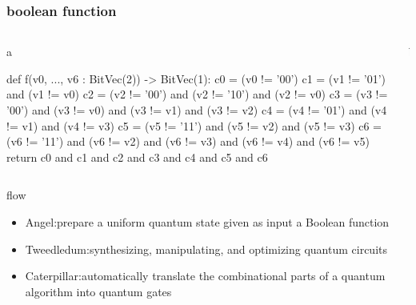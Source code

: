 \documentclass[aspectratio=1610]{beamer}
\begin{document}
\begin{frame}[fragile]
  \frametitle{boolean function}
  \begin{columns}
    \begin{column}{.5\linewidth}
      \begin{block}{a}
        \begin{python}
          def f(v0, ..., v6 : BitVec(2)) -> BitVec(1):
            c0 = (v0 != ’00’)
            c1 = (v1 != ’01’) and (v1 != v0)
            c2 = (v2 != ’00’) and (v2 != ’10’) and (v2 != v0)
            c3 = (v3 != ’00’) and (v3 != v0) and (v3 != v1) and (v3 != v2)
            c4 = (v4 != ’01’) and (v4 != v1) and (v4 != v3)
            c5 = (v5 != ’11’) and (v5 != v2) and (v5 != v3)
            c6 = (v6 != ’11’) and (v6 != v2) and (v6 != v3) and (v6 != v4) and (v6 != v5)
            return c0 and c1 and c2 and c3 and c4 and c5 and c6
        \end{python}
      \end{block}
    \end{column}
    \begin{column}{.5\linewidth}
      b
    \end{column}
  \end{columns}
\end{frame}
\begin{frame}{flow}
  \begin{itemize}
    \item Angel:prepare a uniform quantum state
    given as input a Boolean function
    \item Tweedledum:synthesizing,
    manipulating, and optimizing quantum circuits
    \item Caterpillar:automatically translate the combinational parts of a quantum
    algorithm into quantum gates
  \end{itemize}
\end{frame}
\end{document}
